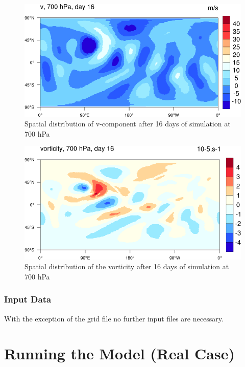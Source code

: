 \begin{figure}[h!]%
\centering
\includegraphics[width=0.95\linewidth]{pictures/v_day_16-small.png}
\caption{Spatial distribution of v-component after 16 days of simulation at 700 hPa}\label{fig:v-16}
\end{figure}


\begin{figure}[h!]%
\centering
\includegraphics[width=0.95\linewidth]{pictures/vorticity_16-o.png}
\caption{Spatial distribution of the vorticity after 16 days of simulation at 700 hPa}\label{fig:vorticity-16}
\end{figure}





\subsubsection{Input Data}

With the exception of the grid file no further input files are necessary. 




\section{Running the Model (Real Case)}
\label{chap:UG_running_model}


